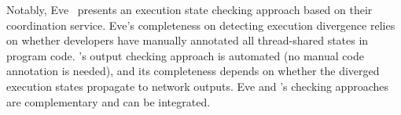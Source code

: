 
Notably, Eve~\cite{eve:osdi12} presents an execution state checking approach 
based on their \paxos coordination service. Eve's completeness on detecting 
execution divergence relies on whether developers have manually annotated all 
thread-shared states in program code. \xxx's output checking approach is 
automated (no manual code annotation is needed), and its completeness depends on 
whether the diverged execution states propagate to network outputs. Eve and 
\xxx's checking approaches are complementary and can be integrated.

% 
% 

